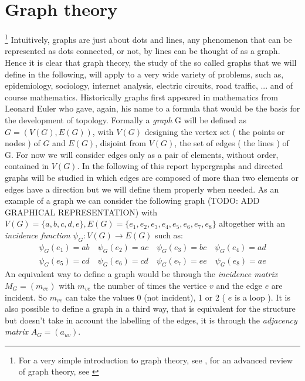 \newtheorem{theorem}{Theorem}[section]
\newtheorem{corollary}{Corollary}[theorem]
\newtheorem{lemma}[theorem]{Lemma}

\section{Graph theory}\footnote{ For a very simple introduction to graph theory, see \cite{Trudeau93}, for an advanced review of graph theory, see \cite{Bondy08}}
Intuitively, graphs are just about dots and lines, any phenomenon that can be represented as dots connected, or not, by lines can be thought of as a graph. 
Hence it is clear that graph theory, the study of the so called graphs that we will define in the following, will apply to a very wide variety of problems, such as, epidemiology, sociology, internet analysis, electric circuits, road traffic, ... and of course mathematics. 
Historically graphs first appeared in mathematics from Leonard Euler who gave, again, his name to a formula that would be the basis for the development of topology.
\newline
Formally a \emph{graph} G will be defined as $G = ( V(G), E(G) )$, with $V(G)$ designing the vertex set ( the points or nodes ) of $G$ and $E(G)$, disjoint from $V(G)$, the set of edges ( the lines ) of G. 
For now we will consider edges only as a pair of elements, without order, contained in $V(G)$. In the following of this report hypergraphs and directed graphs will be studied in which edges are composed of more than two elements or edges have a direction but we will define them properly when needed.
\newline
As an example of a graph we can consider the following graph (TODO: ADD GRAPHICAL REPRESENTATION) with $ V(G) = \{a, b, c, d, e\}, E(G) = \{e_1,e_2, e_3, e_4, e_5, e_6, e_7, e_8\}$ altogether with an \emph{incidence function} $\psi_G : V(G) \rightarrow E(G) $ such as:
\begin{align*}
    \psi_G(e_1) = ab\quad
    \psi_G(e_2) = ac\quad
    \psi_G(e_3) = bc\quad
    \psi_G(e_4) = ad\\
    \psi_G(e_5) = cd\quad
    \psi_G(e_6) = cd\quad
    \psi_G(e_7) = ee\quad
    \psi_G(e_8) = ae
\end{align*}
An equivalent way to define a graph would be through the \emph{incidence matrix} $M_G = (m_{ve}) $ with $m_{ve}$ the number of times the vertice $v$ and the edge $e$ are incident. So $m_{ve}$ can take the values 0 (not incident), 1 or 2 ( $e$ is a loop ).
It is also possible to define a graph in a third way, that is equivalent for the structure but doesn't take in account the labelling of the edges, it is through the \emph{adjacency matrix} $A_G = (a_{uv})$.
